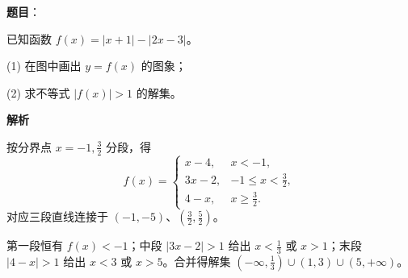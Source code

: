 \begin{answer}

\textbf{题目}：

已知函数 $f(x)=|x+1|-|2x-3|$。

   (1) 在图中画出 $y=f(x)$ 的图象；

   (2) 求不等式 $|f(x)|>1$ 的解集。
\nopagebreak[4]
\begin{center}\end{center}
\nopagebreak[4]
\textbf{解析}


按分界点 \(x=-1,\frac32\) 分段，得
\nopagebreak[4]
\[
f(x)=\begin{cases}
x-4,&x<-1,\\
3x-2,&-1\le x<\frac32,\\
4-x,&x\ge\frac32.
\end{cases}
\]
对应三段直线连接于 \((-1,-5)\)、\((\frac32,\frac52)\)。


第一段恒有 \(f(x)<-1\)；中段 \(|3x-2|>1\) 给出 \(x<\frac13\) 或 \(x>1\)；末段 \(|4-x|>1\) 给出 \(x<3\) 或 \(x>5\)。合并得解集 \((-\infty,\frac13)\cup(1,3)\cup(5,+\infty)\)。



\end{answer}
